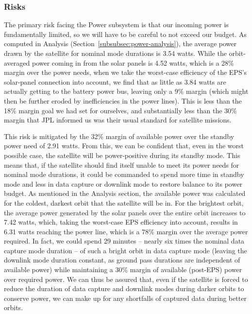 \documentclass[12pt]{article}
\begin{document}
			\subsubsection{Risks}

The primary risk facing the Power subsystem is that our incoming power is fundamentally limited, so we will have to be careful to not exceed our budget.  As computed in Analysis (Section~\ref{subsubsec:power-analysis}), the average power drawn by the satellite for nominal mode durations is 3.54 watts.  While the orbit-averaged power coming in from the solar panels is 4.52 watts, which is a 28\% margin over the power needs, when we take the worst-case efficiency of the EPS's solar-panel connection into account\cite{EPS-manual}, we find that as little as 3.84 watts are actually getting to the battery power bus, leaving only a 9\% margin (which might then be further eroded by inefficiencies in the power lines).  This is less than the 18\% margin goal we had set for ourselves, and substantially less than the 30\% margin that JPL informed us was their usual standard for satellite missions.

This risk is mitigated by the 32\% margin of available power over the standby power need of 2.91 watts.  From this, we can be confident that, even in the worst possible case, the satellite will be power-positive during its standby mode.  This means that, if the satellite should find itself unable to meet its power needs for nominal mode durations, it could be commanded to spend more time in standby mode and less in data capture or downlink mode to restore balance to its power budget.  As mentioned in the Analysis section, the available power was calculated for the coldest, darkest orbit that the satellite will be in.  For the brightest orbit, the average power generated by the solar panels over the entire orbit increases to 7.42 watts, which, taking the worst-case EPS efficiency into account, results in 6.31 watts reaching the power line, which is a 78\% margin over the average power required.  In fact, we could spend 29 minutes -- nearly six times the nominal data capture mode duration -- of such a bright orbit in data capture mode (leaving the downlink mode duration constant, as ground pass durations are independent of available power) while maintaining a 30\% margin of available (post-EPS) power over required power.  We can thus be assured that, even if the satellite is forced to reduce the duration of data capture and downlink modes during darker orbits to conserve power, we can make up for any shortfalls of captured data during better orbits.
\end{document}

